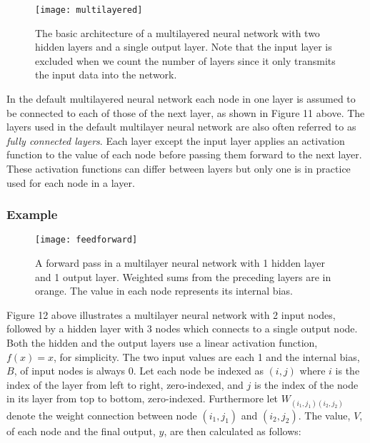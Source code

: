 \documentclass[titlepage]{article}
\begin{document}
\newpage

\begin{figure}[h]
    \centering
    \texttt{[image: multilayered]}
    \vskip 0.2cm
    \caption{The basic architecture of a multilayered neural network with two hidden layers and a single output layer. Note that the input layer is excluded when we count the number of layers since it only transmits the input data into the network. }
\end{figure}

\vskip 0.3cm

\noindent
In the default multilayered neural network \cite{charu} each node in one layer is assumed to be connected to each of those of the next layer, as shown in Figure 11 above. The layers used in the default multilayer neural network are also often referred to as \emph{fully connected layers}. Each layer except the input layer applies an activation function to the value of each node before passing them forward to the next layer. These activation functions can differ between layers but only one is in practice used for each node in a layer.

\vskip 0.2cm

\subsubsection{Example}

\begin{figure}[h]
    \centering
    \texttt{[image: feedforward]}
    \caption{A forward pass in a multilayer neural network with 1 hidden layer and 1 output layer. Weighted sums from the preceding layers are in orange. The value in each node represents its internal bias.}
\end{figure}

\noindent
Figure 12 above illustrates a multilayer neural network with 2 input nodes, followed by a hidden layer with 3 nodes which connects to a single output node. Both the hidden and the output layers use a linear activation function, $f(x) = x$, for simplicity. The two input values are each 1 and the internal bias, $B$, of input nodes is always 0. Let each node be indexed as $(i, j)$ where $i$ is the index of the layer from left to right, zero-indexed, and $j$ is the index of the node in its layer from top to bottom, zero-indexed. Furthermore let $W_{(i_{1}, j_{1}) (i_{2}, j_{2})}$ denote the weight connection between node $(i_{1}, j_{1})$ and $(i_{2}, j_{2})$. The value, $V$, of each node and the final output, $y$, are then calculated as follows: 
\end{document}
